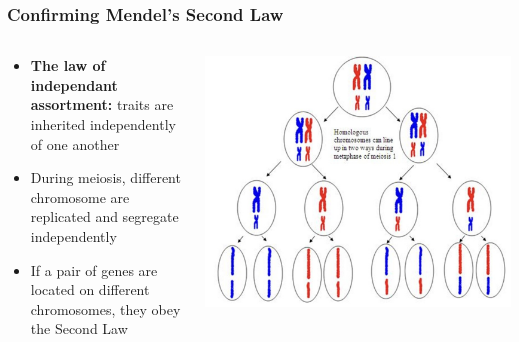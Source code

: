 \documentclass{beamer}
\begin{document}
\begin{frame}
	\frametitle{Confirming Mendel's Second Law}
	
	\begin{columns}
		
		\begin{column}{0.5\textwidth}
			\begin{itemize}
				
				\small 
				\item[]	\textbf{The law of independant assortment:} traits are inherited independently of one another \
				\vspace{10pt}
				
				\item[] During meiosis, different chromosome are replicated and segregate independently
								\vspace{10pt}
				\item[] If a pair of genes are located on different chromosomes, they obey the Second Law
				
			\end{itemize}
		\end{column}
		\begin{column}{0.5\textwidth}
			\includegraphics[keepaspectratio, width  =\textwidth]{img/independentAssortment}

					
			
		\end{column}
	\end{columns}
	
\end{frame}
\end{document}
